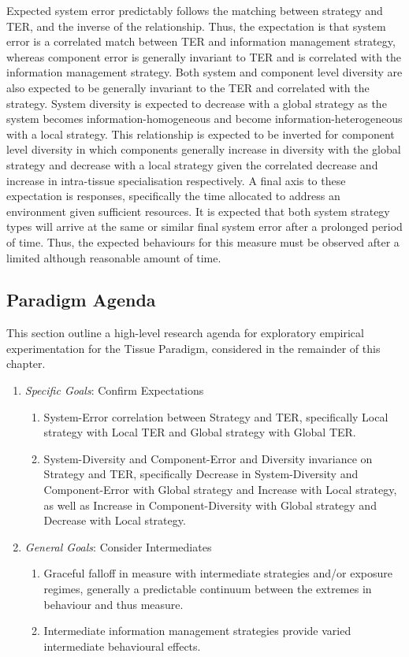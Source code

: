 Expected system error predictably follows the matching between strategy and TER, and the inverse of the relationship. Thus, the expectation is that system error is a correlated match between TER and information management strategy, whereas component error is generally invariant to TER and is correlated with the information management strategy.
Both system and component level diversity are also expected to be generally invariant to the TER and correlated with the strategy. System diversity is expected to decrease with a global strategy as the system becomes information-homogeneous and become information-heterogeneous with a local strategy. This relationship is expected to be inverted for component level diversity in which components generally increase in diversity with the global strategy and decrease with a local strategy given the correlated decrease and increase in intra-tissue specialisation respectively.
A final axis to these expectation is responses, specifically the time allocated to address an environment given sufficient resources. It is expected that both system strategy types will arrive at the same or similar final system error after a prolonged period of time. Thus, the expected behaviours for this measure must be observed after a limited although reasonable amount of time.

%
%
\subsection{Paradigm Agenda}
\label{subsec:tissues:paradigm:method:agenda}
This section outline a high-level research agenda for exploratory empirical experimentation for the Tissue Paradigm, considered in the remainder of this chapter.

\begin{enumerate}
	\item \emph{Specific Goals}: Confirm Expectations
		\begin{enumerate}
			\item System-Error correlation between Strategy and TER, specifically Local strategy with Local TER and Global strategy with Global TER.
			\item System-Diversity and Component-Error and Diversity invariance on Strategy and TER, specifically Decrease in System-Diversity and Component-Error with Global strategy and Increase with Local strategy, as well as Increase in Component-Diversity with Global strategy and Decrease with Local strategy.
		\end{enumerate}
		
	\item \emph{General Goals}: Consider Intermediates
		\begin{enumerate}
			\item Graceful falloff in measure with intermediate strategies and/or exposure regimes, generally a predictable continuum between the extremes in behaviour and thus measure.
			\item Intermediate information management strategies provide varied intermediate behavioural effects.
		\end{enumerate}	
\end{enumerate}


